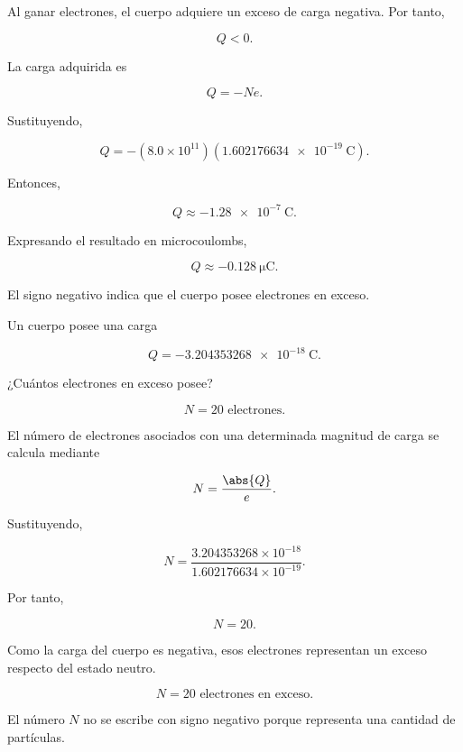 \begin{explicacion}

Al ganar electrones, el cuerpo adquiere un exceso de carga negativa.
Por tanto,

\[
Q<0.
\]

La carga adquirida es

\[
Q=-Ne.
\]

Sustituyendo,

\[
Q=
-\left(8.0\times10^{11}\right)
\left(\SI{1.602176634e-19}{\coulomb}\right).
\]

Entonces,

\[
Q\approx-\SI{1.28e-7}{\coulomb}.
\]

Expresando el resultado en microcoulombs,

\[
\boxed{
Q\approx-\SI{0.128}{\micro\coulomb}
}.
\]

El signo negativo indica que el cuerpo posee electrones en exceso.

\end{explicacion}



\begin{ejercicio}

Un cuerpo posee una carga

\[
Q=-\SI{3.204353268e-18}{\coulomb}.
\]

¿Cuántos electrones en exceso posee?

\end{ejercicio}

\begin{respuesta}

\[
\boxed{
N=20\text{ electrones}
}.
\]

\end{respuesta}

\begin{explicacion}

El número de electrones asociados con una determinada magnitud de carga se
calcula mediante

\[
N=\frac{\abs{Q}}{e}.
\]

Sustituyendo,

\[
N=
\frac{3.204353268\times10^{-18}}
{1.602176634\times10^{-19}}.
\]

Por tanto,

\[
N=20.
\]

Como la carga del cuerpo es negativa, esos electrones representan un exceso
respecto del estado neutro.

\[
\boxed{
N=20\text{ electrones en exceso}
}.
\]

El número \(N\) no se escribe con signo negativo porque representa una
cantidad de partículas.

\end{explicacion}


